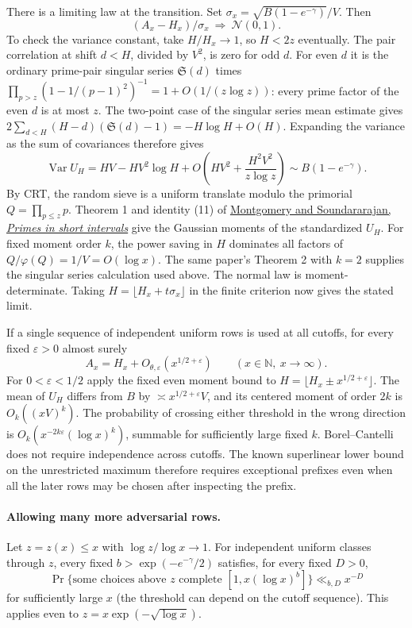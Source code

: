 \documentclass[11pt]{article}
\begin{document}
There is a limiting law at the transition. Set
$\sigma_x=\sqrt{B(1-e^{-\gamma})}/V$. Then
\[
                (A_x-H_x)/\sigma_x\ \Longrightarrow\ \mathcal N(0,1).
\]
To check the variance constant, take $H/H_x\to1$, so $H<2z$
eventually. The pair correlation at shift $d<H$, divided by $V^2$,
is zero for odd $d$. For even $d$ it is the ordinary prime-pair
singular series $\mathfrak S(d)$ times
$\prod_{p>z}(1-1/(p-1)^2)^{-1}=1+O(1/(z\log z))$: every prime factor
of the even $d$ is at most $z$. The two-point case of the singular
series mean estimate gives
$2\sum_{d<H}(H-d)(\mathfrak S(d)-1)=-H\log H+O(H)$.
Expanding the variance as the sum of covariances therefore gives
\[
 \operatorname{Var} U_H=HV-HV^2\log H+
             O\!\left(HV^2+\frac{H^2 V^2}{z\log z}\right)
       \sim B(1-e^{-\gamma}).
\]
By CRT, the random sieve is a uniform translate modulo the primorial
$Q=\prod_{p\le z}p$. Theorem 1 and identity (11) of
\href{https://arxiv.org/pdf/math/0409258}{Montgomery and Soundararajan,
\emph{Primes in short intervals}} give the Gaussian moments of the
standardized $U_H$. For fixed moment order $k$, the power saving in
$H$ dominates all factors of $Q/\varphi(Q)=1/V=O(\log x)$. The same
paper's Theorem 2 with $k=2$ supplies the singular series calculation
used above. The normal law is moment-determinate. Taking
$H=\lfloor H_x+t\sigma_x\rfloor$ in the finite criterion now gives
the stated limit.

If a single sequence of independent uniform rows is used at all
cutoffs, for every fixed $\varepsilon>0$ almost surely
\[
                  A_x=H_x+O_{\theta,\varepsilon}(x^{1/2+\varepsilon})
                  \qquad (x\in\mathbb N,\ x\to\infty).
\]
For $0<\varepsilon<1/2$ apply the fixed even moment bound to
$H=\lfloor H_x\pm x^{1/2+\varepsilon}\rfloor$. The mean of $U_H$
differs from $B$ by $\asymp x^{1/2+\varepsilon}V$, and its centered
moment of order $2k$ is $O_k((xV)^k)$. The probability of crossing
either threshold in the wrong direction is
$O_k(x^{-2k\varepsilon}(\log x)^k)$, summable for sufficiently large
fixed $k$. Borel--Cantelli does not require independence across
cutoffs. The known superlinear lower bound on the unrestricted maximum
therefore requires exceptional prefixes even when all the later rows
may be chosen after inspecting the prefix.

\paragraph{Allowing many more adversarial rows.}
Let $z=z(x)\le x$ with $\log z/\log x\to1$. For independent uniform
classes through $z$, every fixed
$b>\exp(-e^{-\gamma}/2)$ satisfies, for every fixed $D>0$,
\[
 \Pr\{\text{some choices above }z\text{ complete }[1,x(\log x)^b]\}
       \ll_{b,D}x^{-D}
\]
for sufficiently large $x$ (the threshold can depend on the cutoff
sequence). This applies even to $z=x\exp(-\sqrt{\log x})$.
\end{document}
